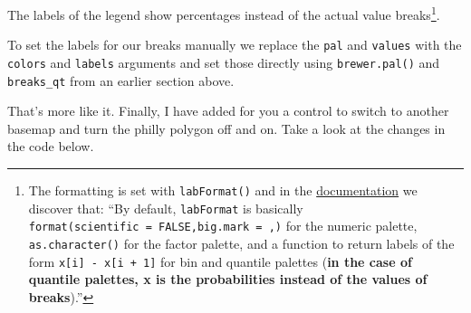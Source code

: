 \documentclass[
]{book}
\newenvironment{Shaded}{\begin{snugshade}}{\end{snugshade}}
\newcommand{\AttributeTok}[1]{\textcolor[rgb]{0.13,0.29,0.53}{#1}}
\newcommand{\ConstantTok}[1]{\textcolor[rgb]{0.56,0.35,0.01}{#1}}
\newcommand{\DecValTok}[1]{\textcolor[rgb]{0.00,0.00,0.81}{#1}}
\newcommand{\FloatTok}[1]{\textcolor[rgb]{0.00,0.00,0.81}{#1}}
\newcommand{\FunctionTok}[1]{\textcolor[rgb]{0.13,0.29,0.53}{\textbf{#1}}}
\newcommand{\NormalTok}[1]{#1}
\newcommand{\SpecialCharTok}[1]{\textcolor[rgb]{0.81,0.36,0.00}{\textbf{#1}}}
\newcommand{\StringTok}[1]{\textcolor[rgb]{0.31,0.60,0.02}{#1}}
\begin{document}
The labels of the legend show percentages instead of the actual value breaks\footnote{The formatting is set with \texttt{labFormat()} and in the \href{https://cran.r-project.org/web/packages/leaflet/leaflet.pdf}{documentation} we discover that: ``By default, \texttt{labFormat} is basically \texttt{format(scientific\ =\ FALSE,big.mark\ =\ \textquotesingle{},\textquotesingle{})} for the numeric palette, \texttt{as.character()} for the factor palette, and a function to return labels of the form \texttt{x{[}i{]}\ -\ x{[}i\ +\ 1{]}} for bin and quantile palettes (\textbf{in the case of quantile palettes, x is the probabilities instead of the values of breaks}).''}.

To set the labels for our breaks manually we replace the \texttt{pal} and \texttt{values} with the \texttt{colors} and \texttt{labels} arguments and set those directly using \texttt{brewer.pal()} and \texttt{breaks\_qt} from an earlier section above.

\begin{Shaded}
\end{Shaded}

That's more like it. Finally, I have added for you a control to switch to another basemap and turn the philly polygon off and on. Take a look at the changes in the code below.
\end{document}
